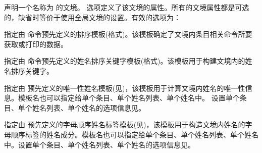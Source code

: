 \begin{ltxsyntax}


声明一个名称为  的文境。 选项定义了该文境的属性。所有的文境属性都是可选的，缺省时等价于使用全局文境的设置。有效的选项为：

\begin{optionlist*}


指定由  命令预先定义的排序模板(格式)。该模板确定了文境内条目相关命令所要获取或打印的数据。


指定由  命令预先定义的姓名排序关键字模板(格式)。该模板用于构建文境内的姓名排序关键字。


指定由  预先定义的唯一性姓名模板(见)，该模板用于计算文境内姓名的唯一性信息。模板名也可以指定给单个条目、单个姓名列表、单个姓名中。
设置单个条目、单个姓名列表、单个姓名的选项信息见。


指定由  预先定义的字母顺序姓名标签模板(见)，该模板用于构造文境内姓名的字母顺序标签的姓名成分。模板名也可以指定给单个条目、单个姓名列表、单个姓名中。设置单个条目、单个姓名列表、单个姓名的选项信息见。


\end{optionlist*}
\end{ltxsyntax}
